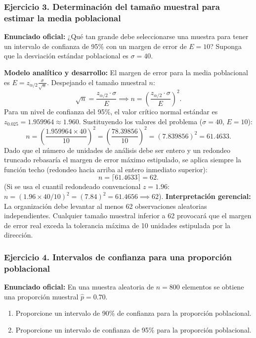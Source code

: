 {\subsubsection*{Ejercicio 3. Determinación del tamaño muestral para estimar la media poblacional}
\textbf{Enunciado oficial:} ¿Qué tan grande debe seleccionarse una muestra para tener un intervalo de confianza de 95\% con un margen de error de $E = 10$? Suponga que la desviación estándar poblacional es $\sigma = 40$.

\textbf{Modelo analítico y desarrollo:}
El margen de error para la media poblacional es $E = z_{\alpha/2} \frac{\sigma}{\sqrt{n}}$. Despejando el tamaño muestral $n$:
\[
  \sqrt{n} = \frac{z_{\alpha/2} \cdot \sigma}{E} \implies n = \left( \frac{z_{\alpha/2} \cdot \sigma}{E} \right)^2.
\]
Para un nivel de confianza del 95\%, el valor crítico normal estándar es $z_{0.025} = 1.959964 \approx 1.960$. Sustituyendo los valores del problema ($\sigma = 40$, $E = 10$):
\[
  n = \left( \frac{1.959964 \times 40}{10} \right)^2 = \left( \frac{78.39856}{10} \right)^2 = (7.839856)^2 = 61.4633.
\]
Dado que el número de unidades de análisis debe ser entero y un redondeo truncado rebasaría el margen de error máximo estipulado, se aplica siempre la función techo (redondeo hacia arriba al entero inmediato superior):
\[
  n = \lceil 61.4633 \rceil = 62.
\]
(Si se usa el cuantil redondeado convencional $z = 1.96$: $n = (1.96 \times 40 / 10)^2 = (7.84)^2 = 61.4656 \implies 62$).
\textbf{Interpretación gerencial:} La organización debe levantar al menos 62 observaciones aleatorias independientes. Cualquier tamaño muestral inferior a 62 provocará que el margen de error real exceda la tolerancia máxima de 10 unidades estipulada por la dirección.

\subsubsection*{Ejercicio 4. Intervalos de confianza para una proporción poblacional}
\textbf{Enunciado oficial:} En una muestra aleatoria de $n = 800$ elementos se obtiene una proporción muestral $\hat{p} = 0.70$.
\begin{enumerate}
  \item[a)] Proporcione un intervalo de 90\% de confianza para la proporción poblacional.
  \item[b)] Proporcione un intervalo de confianza de 95\% para la proporción poblacional.
\end{enumerate}

}
